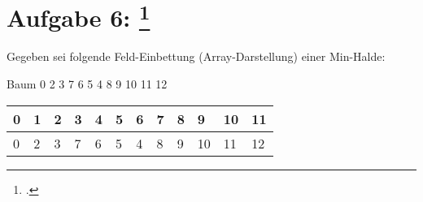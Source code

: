 \documentclass{bschlangaul-aufgabe}
\begin{document}
\section{Aufgabe 6:
\footcite{examen:46115:2017:09}}

Gegeben sei folgende Feld-Einbettung (Array-Darstellung) einer Min-Halde:

\begin{bProjektSprache}{Baum}
0 2 3 7 6 5 4 8 9 10 11 12
\end{bProjektSprache}

\begin{center}
\begin{tabular}{llllllllllll}
\bf{0}  & \bf{1}  & \bf{2}  & \bf{3}  & \bf{4}  & \bf{5}  & \bf{6}  & \bf{7}  & \bf{8}  & \bf{9}  & \bf{10} & \bf{11} \\
\hline
0       & 2       & 3       & 7       & 6       & 5       & 4       & 8       & 9       & 10      & 11      & 12      \\
\end{tabular}
\end{center}
\end{document}
